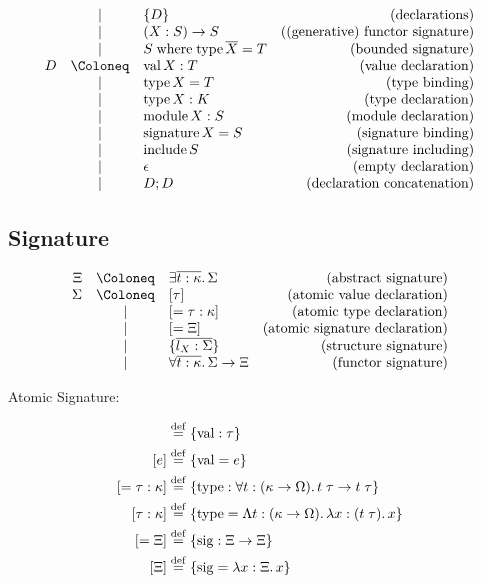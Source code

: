 \begin{align*}
\begin{array}{rclr}
  & \mid & \{ D \} &(\text{declarations}) \\
  & \mid & (X: S) \to S &(\text{(generative) functor signature}) \\
  & \mid & S \symwhere \symtype \overline{X} = T &(\text{bounded signature}) \\
  D
  & \Coloneq & \symval X: T &(\text{value declaration}) \\
  & \mid & \symtype X = T &(\text{type binding}) \\
  & \mid & \symtype X: K &(\text{type declaration}) \\
  & \mid & \symmodule X: S &(\text{module declaration}) \\
  & \mid & \symsignature X = S &(\text{signature binding}) \\
  & \mid & \syminclude S &(\text{signature including}) \\
  & \mid & \epsilon &(\text{empty declaration}) \\
  & \mid & D; D &(\text{declaration concatenation})
  \end{array}
\end{align*}

\subsection{Signature}

\begin{align*}
  \begin{array}{rclr}
  \Xi
  & \Coloneq & \exists \overline{t: \kappa}\ldotp \Sigma &(\text{abstract signature}) \\
  \Sigma
  & \Coloneq & [\tau] &(\text{atomic value declaration}) \\
  & \mid & [= \tau: \kappa] &(\text{atomic type declaration}) \\
  & \mid & [= \Xi] &(\text{atomic signature declaration}) \\
  & \mid & \{\overline{l_X: \Sigma}\} &(\text{structure signature}) \\
  & \mid & \forall \overline{t: \kappa}\ldotp \Sigma \to \Xi &(\text{functor signature})
  \end{array}
\end{align*}

Atomic Signature:

\begin{align*}
  [\tau] &\defrel{=} \{\symval: \tau\} \\
  [e] &\defrel{=} \{\symval = e\} \\
  [= \tau: \kappa] &\defrel{=} \{\symtype: \forall t: (\kappa \to \Omega)\ldotp t\; \tau \to t\; \tau\} \\
  [\tau: \kappa] &\defrel{=} \{\symtype = \Lambda t: (\kappa \to \Omega)\ldotp \lambda x: (t\; \tau)\ldotp x\} \\
  [= \Xi] &\defrel{=} \{\symsig: \Xi \to \Xi\} \\
  [\Xi] &\defrel{=} \{\symsig = \lambda x: \Xi\ldotp x\}
\end{align*}

